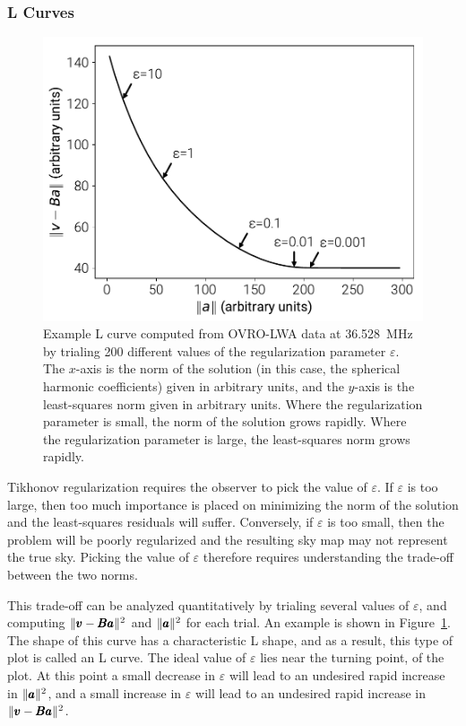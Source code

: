 \begin{bibunit}
\subsubsection{L Curves}

\begin{figure}[t]
    \includegraphics[width=\columnwidth]{figures/chapter3/lcurve}
    \caption{
        Example L curve computed from OVRO-LWA data at 36.528~MHz by trialing 200 different values
        of the regularization parameter $\varepsilon$. The $x$-axis is the norm of the solution (in
        this case, the spherical harmonic coefficients) given in arbitrary units, and the $y$-axis
        is the least-squares norm given in arbitrary units. Where the regularization parameter is
        small, the norm of the solution grows rapidly. Where the regularization parameter is large,
        the least-squares norm grows rapidly.
    }
    \label{fig:lcurve}
\end{figure}

Tikhonov regularization requires the observer to pick the value of $\varepsilon$. If $\varepsilon$
is too large, then too much importance is placed on minimizing the norm of the solution and the
least-squares residuals will suffer. Conversely, if $\varepsilon$ is too small, then the problem
will be poorly regularized and the resulting sky map may not represent the true sky. Picking the
value of $\varepsilon$ therefore requires understanding the trade-off between the two norms.

This trade-off can be analyzed quantitatively by trialing several values of $\varepsilon$, and
computing $\|\pmb v - \pmb B\pmb a\|^2$ and $\|\pmb a\|^2$ for each trial. An example is shown in
Figure~\ref{fig:lcurve}. The shape of this curve has a characteristic L shape, and as a result, this
type of plot is called an L curve. The ideal value of $\varepsilon$ lies near the turning point, of
the plot. At this point a small decrease in $\varepsilon$ will lead to an undesired rapid increase
in $\|\pmb a\|^2$, and a small increase in $\varepsilon$ will lead to an undesired rapid increase in
$\|\pmb v - \pmb B\pmb a\|^2$.


\end{bibunit}
